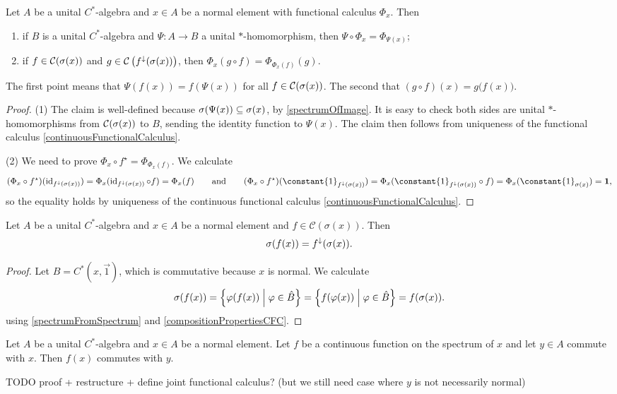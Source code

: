 \begin{proposition} \label{compositionPropertiesCFC}
Let $A$ be a unital $C^*$-algebra and $x\in A$ be a normal element with functional calculus $\Phi_x$. Then
\begin{enumerate}
\item if $B$ is a unital $C^*$-algebra and $\Psi: A\to B$ a unital $*$-homomorphism, then $\Psi\circ\Phi_x = \Phi_{\Psi(x)}$;
\item if $f\in\operatorname{\mathcal{C}}(\sigma(x))$ and $g\in\operatorname{\mathcal{C}}\big(f^{\downarrow}(\sigma(x))\big)$, then $\Phi_x(g\circ f) = \Phi_{\Phi_x(f)}(g)$.
\end{enumerate}
\end{proposition}
The first point means that $\Psi(f(x)) = f(\Psi(x))$ for all $f\in \operatorname{\mathcal{C}}(\sigma(x))$. The second that $(g\circ f)(x) = g\big(f(x)\big)$.
\begin{proof}
(1) The claim is well-defined because $\sigma(\Psi(x))\subseteq \sigma(x)$, by \ref{spectrumOfImage}. It is easy to check both sides are unital $*$-homomorphisms from $\operatorname{\mathcal{C}}(\sigma(x))$ to $B$, sending the identity function to $\Psi(x)$. The claim then follows from uniqueness of the functional calculus \ref{continuousFunctionalCalculus}.

(2) We need to prove $\Phi_x\circ f^\star = \Phi_{\Phi_x(f)}$. We calculate
\[ (\Phi_x\circ f^\star)(\id_{f^\imf(\spec(x))}) = \Phi_x(\id_{f^\imf(\spec(x))}\circ f) = \Phi_x(f) \qquad\text{and}\qquad (\Phi_x\circ f^\star)(\constant{1}_{f^\imf(\spec(x))}) = \Phi_x(\constant{1}_{f^\imf(\spec(x))}\circ f) = \Phi_x(\constant{1}_{\spec(x)}) = \vec{1}, \]
so the equality holds by uniqueness of the continuous functional calculus \ref{continuousFunctionalCalculus}.
\end{proof}

\begin{proposition} \label{spectralMappingCFC}
Let $A$ be a unital $C^*$-algebra and $x\in A$ be a normal element and $f\in\mathcal{C}(\sigma(x))$. Then
\[ \sigma(f(x)) = f^\downarrow(\sigma(x)). \]
\end{proposition}
\begin{proof}
Let $B = C^*(x,\vec{1})$, which is commutative because $x$ is normal. We calculate
\[ \sigma(f(x)) = \setbuilder{\varphi(f(x))}{\varphi\in\hat{B}} = \setbuilder{f(\varphi(x))}{\varphi\in\hat{B}} = f(\sigma(x)). \]
using \ref{spectrumFromSpectrum} and \ref{compositionPropertiesCFC}.
\end{proof}


\begin{proposition} \label{commutativityFunctionalCalculus}
Let $A$ be a unital $C^*$-algebra and $x\in A$ be a normal element. Let $f$ be a continuous function on the spectrum of $x$ and let $y\in A$ commute with $x$. Then $f(x)$ commutes with $y$.
\end{proposition}
TODO proof + restructure + define joint functional calculus? (but we still need case where $y$ is not necessarily normal)


